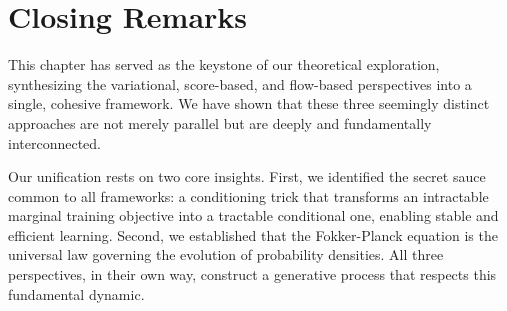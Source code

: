 \newpage

\section{Closing Remarks}\label{subsec:takeaway-dm-gaussianfm}






This chapter has served as the keystone of our theoretical exploration, synthesizing the variational, score-based, and flow-based perspectives into a single, cohesive framework. We have shown that these three seemingly distinct approaches are not merely parallel but are deeply and fundamentally interconnected.

Our unification rests on two core insights. First, we identified the secret sauce common to all frameworks: a conditioning trick that transforms an intractable marginal training objective into a tractable conditional one, enabling stable and efficient learning. Second, we established that the Fokker-Planck equation is the universal law governing the evolution of probability densities. All three perspectives, in their own way, construct a generative process that respects this fundamental dynamic.


